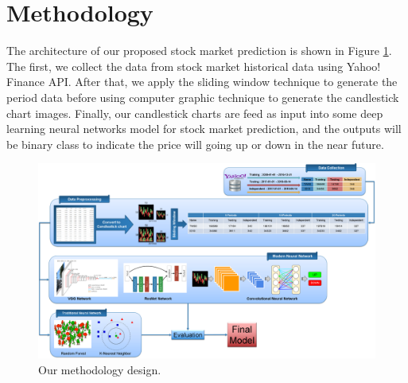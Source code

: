 \documentclass[10pt,twocolumn]{article}
\begin{document}
\section{Methodology}
The architecture of our proposed stock market prediction is shown in Figure \ref{fig:methodologydesign}. The first, we collect the data from stock market historical data using Yahoo! Finance API. After that, we apply the sliding window technique to generate the period data before using computer graphic technique to generate the candlestick chart images. Finally, our candlestick charts are feed as input into some deep learning neural networks model for stock market prediction, and the outputs will be binary class to indicate the price will going up or down in the near future.
\begin{figure}
  \includegraphics[width=\linewidth]{figures/methodology.png}
  \caption{Our methodology design.}
  \label{fig:methodologydesign}
\end{figure}
\end{document}
